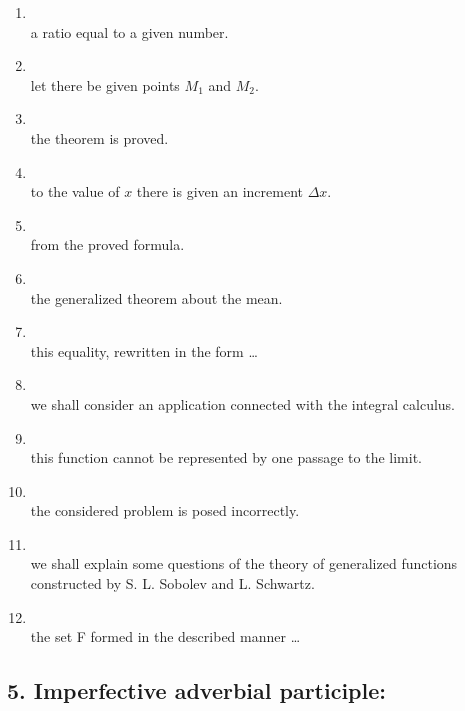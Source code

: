 \begin{enumerate}[label=4.\arabic*)]
\item {}\\
      a ratio equal to a given number.
\item {}\\
      let there be given points $M_1$ and $M_2$.
\item {}\\
      the theorem is proved.
\item {}\\
      to the value of $x$ there is given an increment $\Delta x$.
\item {}\\
      from the proved formula.
\item {}\\
      the generalized theorem about the mean.
\item {}\\
      this equality, rewritten in the form \ldots
\item {}\\
      we shall consider an application connected with the integral calculus.
\item {}\\
      this function cannot be represented by one passage to the limit.
\item {}\\
      the considered problem is posed incorrectly.
\item {}\\
      we shall explain some questions of the theory of generalized functions constructed by S. L. Sobolev and L. Schwartz.
\item {}\\
      the set F formed in the described manner \ldots
\end{enumerate}

\subsection*{5. Imperfective adverbial participle: }

